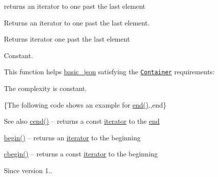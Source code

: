 returns an iterator to one past the last element 

Returns an iterator to one past the last element.

 \begin{DoxyReturn}{Returns}
iterator one past the last element
\end{DoxyReturn}
Constant.

This function helps {\ttfamily \mbox{\hyperlink{classnlohmann_1_1basic__json}{basic\+\_\+json}}} satisfying the \href{http://en.cppreference.com/w/cpp/concept/Container}{\tt Container} requirements\+:
\begin{DoxyItemize}
\item The complexity is constant.
\end{DoxyItemize}

\{The following code shows an example for {\ttfamily \mbox{\hyperlink{classnlohmann_1_1basic__json_a13e032a02a7fd8a93fdddc2fcbc4763c}{end()}}}.,end\}

\begin{DoxySeeAlso}{See also}
\mbox{\hyperlink{classnlohmann_1_1basic__json_a8dba7b7d2f38e6b0c614030aa43983f6}{cend()}} -- returns a const \mbox{\hyperlink{classnlohmann_1_1basic__json_a099316232c76c034030a38faa6e34dca}{iterator}} to the \mbox{\hyperlink{classnlohmann_1_1basic__json_a13e032a02a7fd8a93fdddc2fcbc4763c}{end}} 

\mbox{\hyperlink{classnlohmann_1_1basic__json_a0ff28dac23f2bdecee9564d07f51dcdc}{begin()}} -- returns an \mbox{\hyperlink{classnlohmann_1_1basic__json_a099316232c76c034030a38faa6e34dca}{iterator}} to the beginning 

\mbox{\hyperlink{classnlohmann_1_1basic__json_ad865d6c291b237ae508d5cb2146b5877}{cbegin()}} -- returns a const \mbox{\hyperlink{classnlohmann_1_1basic__json_a099316232c76c034030a38faa6e34dca}{iterator}} to the beginning
\end{DoxySeeAlso}
\begin{DoxySince}{Since}
version 1.. 
\end{DoxySince}
\mbox{\label{classnlohmann_1_1basic__json_a1c15707055088cd5436ae91db72cbe67}} 
